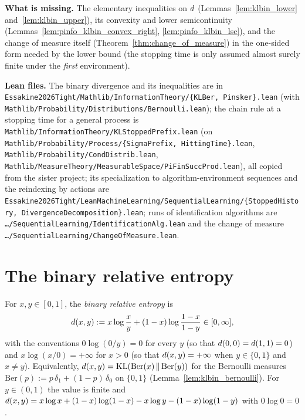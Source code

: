 \textbf{What is missing.} The elementary inequalities on $d$
(Lemmas~\ref{lem:klbin_lower} and~\ref{lem:klbin_upper}), its convexity and lower semicontinuity
(Lemmas~\ref{lem:pinfo_klbin_convex_right}, \ref{lem:pinfo_klbin_lsc}), and the change of measure
itself (Theorem~\ref{thm:change_of_measure}) in the one-sided form needed by the lower bound
(the stopping time is only assumed almost surely finite under the \emph{first} environment).

\textbf{Lean files.} The binary divergence and its inequalities are in
\texttt{Essakine2026Tight/Mathlib/InformationTheory/\{KLBer, Pinsker\}.lean} (with
\texttt{Mathlib/Probability/Distributions/Bernoulli.lean}); the chain rule at a stopping time for a
general process is \texttt{Mathlib/InformationTheory/KLStoppedPrefix.lean} (on
\texttt{Mathlib/Probability/Process/\{SigmaPrefix, HittingTime\}.lean},
\texttt{Mathlib/Probability/CondDistrib.lean},
\texttt{Mathlib/MeasureTheory/MeasurableSpace/PiFinSuccProd.lean}), all copied from the sister
project; its specialization to algorithm-environment sequences and the reindexing by actions are
\texttt{Essakine2026Tight/LeanMachineLearning/SequentialLearning/\{StoppedHistory,
DivergenceDecomposition\}.lean}; runs of identification algorithms are
\texttt{…/SequentialLearning/IdentificationAlg.lean} and the change of measure
\texttt{…/SequentialLearning/ChangeOfMeasure.lean}.

\section{The binary relative entropy}
\label{sec:pinfo_klbin}

\begin{definition}\label{def:klbin}
\leanok
For $x, y \in [0, 1]$, the \emph{binary relative entropy} is
\[
  d(x, y) := x\log\frac{x}{y} + (1 - x)\log\frac{1 - x}{1 - y} \in [0, \infty],
\]
with the conventions $0\log(0/y) = 0$ for every $y$ (so that $d(0, 0) = d(1, 1) = 0$)
and $x\log(x/0) = +\infty$ for $x > 0$ (so that $d(x, y) = +\infty$ when $y \in \{0, 1\}$
and $x \ne y$). Equivalently, $d(x, y) = \mathrm{KL}(\mathrm{Ber}(x)\,\|\,\mathrm{Ber}(y))$ for the
Bernoulli measures $\mathrm{Ber}(p) := p\,\delta_1 + (1 - p)\,\delta_0$ on $\{0, 1\}$
(Lemma~\ref{lem:klbin_bernoulli}). For $y \in (0, 1)$ the value is finite and
$d(x, y) = x\log x + (1-x)\log(1-x) - x\log y - (1-x)\log(1-y)$ with $0\log 0 = 0$.
\end{definition}

